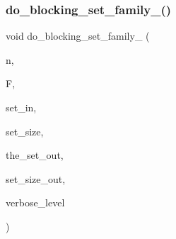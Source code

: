 \mbox{\label{geometric__object_8_c_ae952cf1470f33232439be751e56a07b3}} 
\subsubsection{\texorpdfstring{do\+\_\+blocking\+\_\+set\+\_\+family\+\_()}{do\_blocking\_set\_family\_3()}}
{\footnotesize\ttfamily void do\+\_\+blocking\+\_\+set\+\_\+family\+\_ (\begin{DoxyParamCaption}\item[{\mbox{\hyperlink{galois_8h_a09fddde158a3a20bd2dcadb609de11dc}{I\+NT}}}]{n,  }\item[{\mbox{\hyperlink{classfinite__field}{finite\+\_\+field}} $\ast$}]{F,  }\item[{\mbox{\hyperlink{galois_8h_a09fddde158a3a20bd2dcadb609de11dc}{I\+NT}} $\ast$}]{set\+\_\+in,  }\item[{\mbox{\hyperlink{galois_8h_a09fddde158a3a20bd2dcadb609de11dc}{I\+NT}}}]{set\+\_\+size,  }\item[{\mbox{\hyperlink{galois_8h_a09fddde158a3a20bd2dcadb609de11dc}{I\+NT}} $\ast$\&}]{the\+\_\+set\+\_\+out,  }\item[{\mbox{\hyperlink{galois_8h_a09fddde158a3a20bd2dcadb609de11dc}{I\+NT}} \&}]{set\+\_\+size\+\_\+out,  }\item[{\mbox{\hyperlink{galois_8h_a09fddde158a3a20bd2dcadb609de11dc}{I\+NT}}}]{verbose\+\_\+level }\end{DoxyParamCaption})}

\mbox{\label{geometric__object_8_c_a7bb3ddfb35045392c9df76ad5b0d1753}} 
